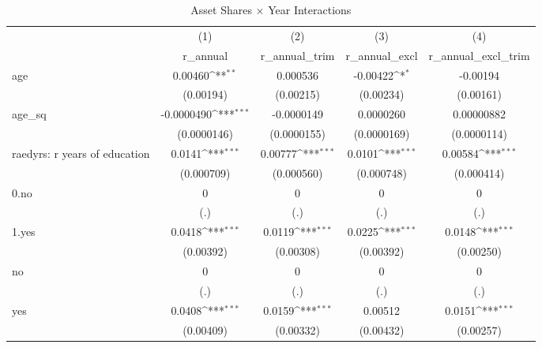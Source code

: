 \begin{table}[htbp]\centering
\def\sym#1{\ifmmode^{#1}\else\(^{#1}\)\fi}
\caption{Asset Shares × Year Interactions}
\begin{tabular}{l*{4}{c}}
\toprule
                &\multicolumn{1}{c}{(1)}&\multicolumn{1}{c}{(2)}&\multicolumn{1}{c}{(3)}&\multicolumn{1}{c}{(4)}\\
                &\multicolumn{1}{c}{r\_annual}&\multicolumn{1}{c}{r\_annual\_trim}&\multicolumn{1}{c}{r\_annual\_excl}&\multicolumn{1}{c}{r\_annual\_excl\_trim}\\
\midrule
age             &  0.00460\sym{**} & 0.000536         & -0.00422\sym{*}  & -0.00194         \\
                &(0.00194)         &(0.00215)         &(0.00234)         &(0.00161)         \\
\addlinespace
age\_sq          &-0.0000490\sym{***}&-0.0000149         &0.0000260         &0.00000882         \\
                &(0.0000146)         &(0.0000155)         &(0.0000169)         &(0.0000114)         \\
\addlinespace
raedyrs: r years of education&   0.0141\sym{***}&  0.00777\sym{***}&   0.0101\sym{***}&  0.00584\sym{***}\\
                &(0.000709)         &(0.000560)         &(0.000748)         &(0.000414)         \\
\addlinespace
0.no            &        0         &        0         &        0         &        0         \\
                &      (.)         &      (.)         &      (.)         &      (.)         \\
\addlinespace
1.yes           &   0.0418\sym{***}&   0.0119\sym{***}&   0.0225\sym{***}&   0.0148\sym{***}\\
                &(0.00392)         &(0.00308)         &(0.00392)         &(0.00250)         \\
\addlinespace
no              &        0         &        0         &        0         &        0         \\
                &      (.)         &      (.)         &      (.)         &      (.)         \\
\addlinespace
yes             &   0.0408\sym{***}&   0.0159\sym{***}&  0.00512         &   0.0151\sym{***}\\
                &(0.00409)         &(0.00332)         &(0.00432)         &(0.00257)         \\

\end{tabular}
\end{table}
